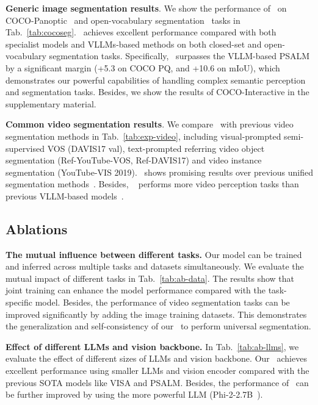 \noindent\textbf{Generic image segmentation results}.
We show the performance of \name~on  COCO-Panoptic~\cite{Lin2014MicrosoftCC} and open-vocabulary segmentation~\cite{zhou2019semantic,Cordts2016Cityscapes,mottaghi2014role,everingham2010pascal} tasks in Tab.~\ref{tab:cocoseg}.
\name~achieves excellent performance compared with both specialist models and VLLMs-based methods on both closed-set and open-vocabulary segmentation tasks. Specifically, \name~surpasses the VLLM-based PSALM by a significant margin (+5.3 on COCO PQ, and +10.6 on mIoU), which demonstrates our powerful capabilities of handling complex semantic perception and segmentation tasks.
Besides, we show the results of COCO-Interactive in the supplementary material.

\noindent\textbf{Common video segmentation results}.
We compare \name~with previous video segmentation methods in Tab.~\ref{tab:exp-video}, including visual-prompted semi-supervised VOS (DAVIS17 val), text-prompted referring video object segmentation (Ref-YouTube-VOS, Ref-DAVIS17) and video instance segmentation (YouTube-VIS 2019).
\name~shows promising results over previous unified segmentation methods~\cite{li2024omg,lin2023uninext}.
Besides, \name~ performs more video perception tasks than previous VLLM-based models~\cite{yan2024visa,bai2024one}.

\subsection{Ablations}

\noindent\textbf{The mutual influence between different tasks.} 
Our model can be trained and inferred across multiple tasks and datasets simultaneously.
We evaluate the mutual impact of different tasks in Tab.~\ref{tab:ab-data}. The results show that joint training can enhance the model performance compared with the task-specific model.
Besides, the performance of video segmentation tasks can be improved significantly by adding the image training datasets.
This demonstrates the generalization and self-consistency of our \name~to perform universal segmentation. 

 

\noindent\textbf{Effect of different LLMs and vision backbone.} In Tab.~\ref{tab:ab-llms}, we evaluate the effect of different sizes of LLMs and vision backbone.
Our \name~achieves excellent performance using smaller LLMs and vision encoder compared with the previous SOTA models like VISA\cite{yan2024visa} and PSALM\cite{zhang2024psalm}.
Besides, the performance of \name~can be further improved by using the more powerful LLM (Phi-2-2.7B~\cite{javaheripi2023phi}). 


